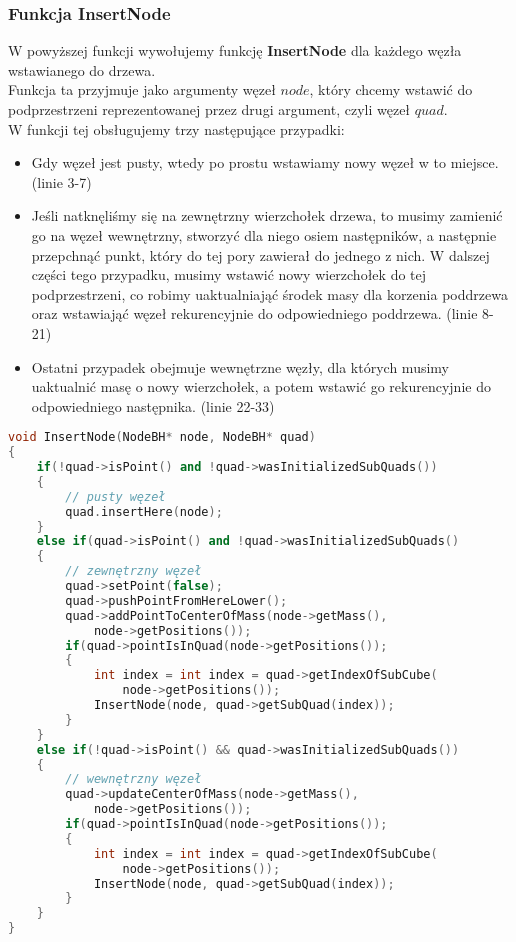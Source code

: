 \documentclass[14pt,twoside,a4paper]{article}
\theoremstyle{definition}
\begin{document}
\subsubsection{\large Funkcja InsertNode}

W powyższej funkcji wywołujemy funkcję \textbf{InsertNode} dla każdego węzła wstawianego do drzewa. \\
\bigskip
Funkcja ta przyjmuje jako argumenty węzeł $node$, który chcemy wstawić do podprzestrzeni reprezentowanej przez drugi argument, czyli węzeł $quad$.\\ W funkcji tej obsługujemy trzy następujące przypadki:
\begin{itemize}
\item Gdy węzeł jest pusty, wtedy po prostu wstawiamy nowy węzeł w to miejsce. (linie 3-7)
\item Jeśli natknęliśmy się na zewnętrzny wierzchołek drzewa, to musimy zamienić go na węzeł wewnętrzny, stworzyć dla niego osiem następników, a następnie przepchnąć punkt, który do tej pory zawierał do jednego z nich. W dalszej części tego przypadku, musimy wstawić nowy wierzchołek do tej podprzestrzeni, co robimy uaktualniająć środek masy dla korzenia poddrzewa oraz wstawiająć węzeł rekurencyjnie do odpowiedniego poddrzewa. (linie 8-21)
\item Ostatni przypadek obejmuje wewnętrzne węzły, dla których musimy uaktualnić masę o nowy wierzchołek, a potem wstawić go rekurencyjnie do odpowiedniego następnika. (linie 22-33)
\end{itemize}

\begin{lstlisting}[language=C++, frame=single, framerule=2pt, caption=Wstawianie pojedynczego węzła do drzewa]
void InsertNode(NodeBH* node, NodeBH* quad) 
{
    if(!quad->isPoint() and !quad->wasInitializedSubQuads()) 
    {
        // pusty węzeł
        quad.insertHere(node);
    }
    else if(quad->isPoint() and !quad->wasInitializedSubQuads()
    {
        // zewnętrzny węzeł
        quad->setPoint(false);
        quad->pushPointFromHereLower();
        quad->addPointToCenterOfMass(node->getMass(), 
            node->getPositions());
        if(quad->pointIsInQuad(node->getPositions());
        {
            int index = int index = quad->getIndexOfSubCube(
                node->getPositions());
            InsertNode(node, quad->getSubQuad(index));
        }
    }
    else if(!quad->isPoint() && quad->wasInitializedSubQuads())
    {
        // wewnętrzny węzeł
        quad->updateCenterOfMass(node->getMass(), 
            node->getPositions());
        if(quad->pointIsInQuad(node->getPositions());
        {
            int index = int index = quad->getIndexOfSubCube(
                node->getPositions());
            InsertNode(node, quad->getSubQuad(index));
        }
    }
}
\end{lstlisting}
\end{document}
